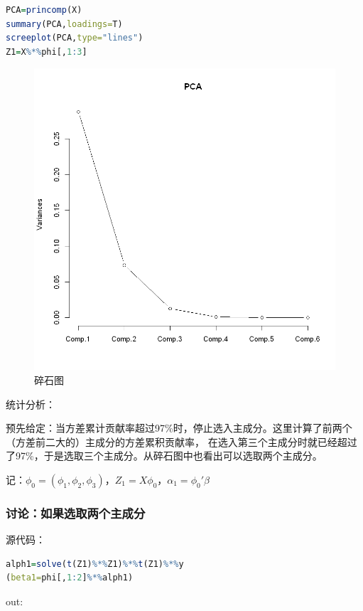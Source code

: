 \documentclass[a4paper,12pt]{article}
\begin{document}
\begin{lstlisting}[language=r,breaklines]
PCA=princomp(X)
summary(PCA,loadings=T)
screeplot(PCA,type="lines")
Z1=X%*%phi[,1:3]
\end{lstlisting}
\begin{figure}[htbp]
	\centering
	\includegraphics[scale=0.3]{output_18_1.png}
	\caption{碎石图}
\end{figure}

统计分析：

预先给定：当方差累计贡献率超过97\%时，停止选入主成分。这里计算了前两个（方差前二大的）主成分的方差累积贡献率，
在选入第三个主成分时就已经超过了97\%，于是选取三个主成分。从碎石图中也看出可以选取两个主成分。

记：$\phi_0=(\phi_1,\phi_2,\phi_3)$，$Z_1=X\phi_0$，$\alpha_1=\phi_0'\beta$
\subsubsection{讨论：如果选取两个主成分}
源代码：
\begin{lstlisting}[language=r,breaklines]
alph1=solve(t(Z1)%*%Z1)%*%t(Z1)%*%y
(beta1=phi[,1:2]%*%alph1)
\end{lstlisting}

out: 
\end{document}
